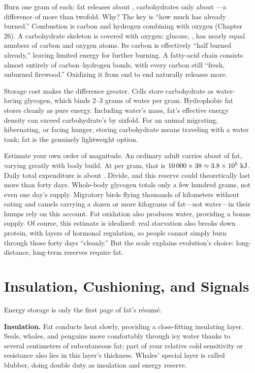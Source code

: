 \begin{qiaoliang}
Burn one gram of each: fat releases about , carbohydrates only about ---a difference of more than twofold. Why? The key is ``how much has already burned.'' Combustion is carbon and hydrogen combining with oxygen (Chapter 26). A carbohydrate skeleton is covered with oxygen: glucose, , has nearly equal numbers of carbon and oxygen atoms. Its carbon is effectively ``half burned already,'' leaving limited energy for further burning. A fatty-acid chain consists almost entirely of carbon--hydrogen bonds, with every carbon still ``fresh, unburned firewood.'' Oxidizing it from end to end naturally releases more.

Storage cost makes the difference greater. Cells store carbohydrate as water-loving glycogen, which binds 2--3 grams of water per gram. Hydrophobic fat stores cleanly as pure energy. Including water's mass, fat's effective energy density can exceed carbohydrate's by sixfold. For an animal migrating, hibernating, or facing hunger, storing carbohydrate means traveling with a water tank; fat is the genuinely lightweight option.
\end{qiaoliang}

Estimate your own order of magnitude. An ordinary adult carries about  of fat, varying greatly with body build. At  per gram, that is $10\,000 \times 38 \approx 3.8\times 10^{5}\ \mathrm{kJ}$. Daily total expenditure is about . Divide, and this reserve could theoretically last more than forty days. Whole-body glycogen totals only a few hundred grams, not even one day's supply. Migratory birds flying thousands of kilometers without eating and camels carrying a dozen or more kilograms of fat---not water---in their humps rely on this account. Fat oxidation also produces water, providing a bonus supply. Of course, this estimate is idealized: real starvation also breaks down protein, with layers of hormonal regulation, so people cannot simply burn through those forty days ``cleanly.'' But the scale explains evolution's choice: long-distance, long-term reserves require fat.

\section{Insulation, Cushioning, and Signals}

Energy storage is only the first page of fat's résumé.

\textbf{Insulation.} Fat conducts heat slowly, providing a close-fitting insulating layer. Seals, whales, and penguins move comfortably through icy water thanks to several centimeters of subcutaneous fat; part of your relative cold sensitivity or resistance also lies in this layer's thickness. Whales' special layer is called blubber, doing double duty as insulation and energy reserve.

